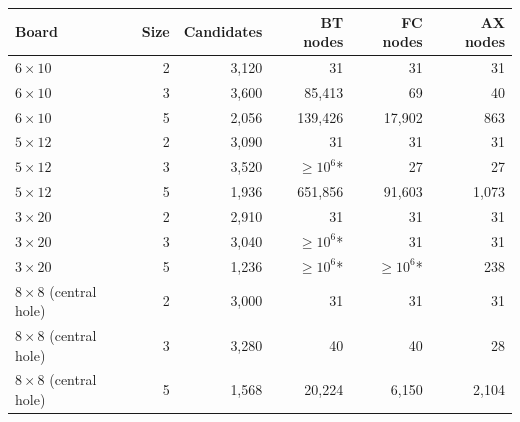 \begin{tabular}{lrrrrr}
\toprule
Board & Size & Candidates & BT nodes & FC nodes & AX nodes \\
\midrule
$6\times10$ & 2 & 3,120 & 31 & 31 & 31 \\
$6\times10$ & 3 & 3,600 & 85,413 & 69 & 40 \\
$6\times10$ & 5 & 2,056 & 139,426 & 17,902 & 863 \\
$5\times12$ & 2 & 3,090 & 31 & 31 & 31 \\
$5\times12$ & 3 & 3,520 & $\geq 10^6$* & 27 & 27 \\
$5\times12$ & 5 & 1,936 & 651,856 & 91,603 & 1,073 \\
$3\times20$ & 2 & 2,910 & 31 & 31 & 31 \\
$3\times20$ & 3 & 3,040 & $\geq 10^6$* & 31 & 31 \\
$3\times20$ & 5 & 1,236 & $\geq 10^6$* & $\geq 10^6$* & 238 \\
$8\times8$ (central hole) & 2 & 3,000 & 31 & 31 & 31 \\
$8\times8$ (central hole) & 3 & 3,280 & 40 & 40 & 28 \\
$8\times8$ (central hole) & 5 & 1,568 & 20,224 & 6,150 & 2,104 \\
\bottomrule
\end{tabular}
